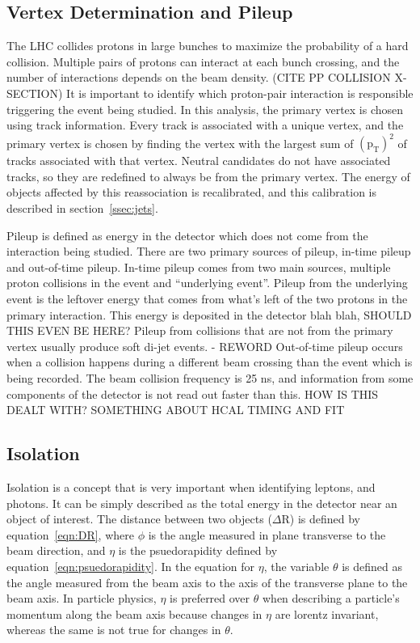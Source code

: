 \subsection{Vertex Determination and Pileup}
\label{ssec:vtxandpileup}
The LHC collides protons in large bunches to maximize the probability of a hard collision.
Multiple pairs of protons can interact at each bunch crossing, and the number of interactions depends on the beam density. (CITE PP COLLISION X-SECTION)
It is important to identify which proton-pair interaction is responsible triggering the event being studied.
In this analysis, the primary vertex is chosen using track information.
Every track is associated with a unique vertex,
and the primary vertex is chosen by finding the vertex with the largest sum of $\mathrm{(p_{T})^{2}}$ of tracks associated with that vertex.
Neutral candidates do not have associated tracks, so they are redefined to always be from the primary vertex.
The energy of objects affected by this reassociation is recalibrated, and this calibration is described in section~\ref{ssec:jets}.

Pileup is defined as energy in the detector which does not come from the interaction being studied.
There are two primary sources of pileup, in-time pileup and out-of-time pileup.
In-time pileup comes from two main sources, multiple proton collisions in the event and ``underlying event''.
Pileup from the underlying event is the leftover energy that comes from what's left of the two protons in the primary interaction.
This energy is deposited in the detector blah blah, SHOULD THIS EVEN BE HERE?
Pileup from collisions that are not from the primary vertex usually produce soft di-jet events. - REWORD
Out-of-time pileup occurs when a collision happens during a different beam crossing than the event which is being recorded. 
The beam collision frequency is 25 ns, and information from some components of the detector is not read out faster than this.
HOW IS THIS DEALT WITH? SOMETHING ABOUT HCAL TIMING AND FIT

\subsection{Isolation}
Isolation is a concept that is very important when identifying leptons, and photons.
It can be simply described as the total energy in the detector near an object of interest.
The distance between two objects ($\Delta$R) is defined by equation~\ref{eqn:DR},
where $\phi$ is the angle measured in plane transverse to the beam direction,
and $\eta$ is the psuedorapidity defined by equation~\ref{eqn:psuedorapidity}.
In the equation for $\eta$, the variable $\theta$ is defined as the angle measured from the beam axis to the axis of the transverse plane to the beam axis.
In particle physics, $\eta$ is preferred over $\theta$ when describing a particle's momentum along the beam axis because changes in $\eta$ are lorentz invariant,
whereas the same is not true for changes in $\theta$.

